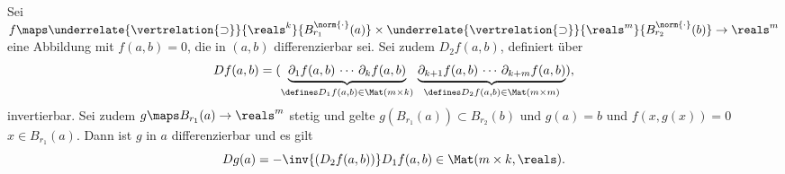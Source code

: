 \begin{satz}\label{funktion_ableiten_mit_hoeheren_abbildungen}
  Sei \( f\maps \underrelate{\vertrelation{\supset}}{\reals^k}{B_{r_1}^{\norm{\cdot}}(a)}\times \underrelate{\vertrelation{\supset}}{\reals^m}{B_{r_2}^{\norm{\cdot}}(b)}\to \reals^m \) eine Abbildung mit \( f(a,b)=0 \), die in \( (a,b) \) differenzierbar sei. Sei zudem \( D_2 f(a,b) \), definiert über
  \begin{equation*}
    Df(a,b)=(\underbrace{\partial_1 f(a,b)\, \cdots\,  \partial_k f(a,b)}_{\defines D_1 f(a,b)\in \Mat(m\times k)}\, \underbrace{\partial_{k+1}f(a,b)\, \cdots\, \partial_{k+m}f(a,b)}_{\defines D_2 f(a,b)\in \Mat(m\times m)}),
  \end{equation*}
  invertierbar. Sei zudem \( g\maps B_{r_1}(a)\to \reals^m \) stetig und gelte \( g(B_{r_1}(a))\subset B_{r_2}(b) \) und \( g(a)=b \) und \( f(x,g(x))=0 \) \tforall \( x\in B_{r_1}(a) \). Dann ist \( g \) in \( a \) differenzierbar und es gilt
  \begin{equation*}
    Dg(a)=-\inv{\left( D_2f(a,b) \right)}D_1 f(a,b)\in \Mat(m\times k, \reals).
  \end{equation*}
\end{satz}
